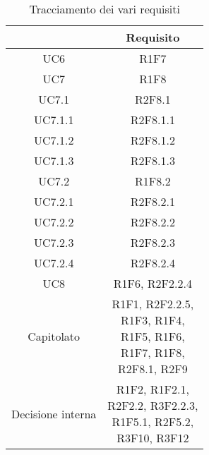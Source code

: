 \begin{table}[H]
	\centering
	\renewcommand{\arraystretch}{1.8}
	\begin{tabular}{c | c}
		\rowcolor[HTML]{125E28}
		\multicolumn{1}{c}{\color[HTML]{FFFFFF} \textbf{Fonte}} &
		\multicolumn{1}{c}{\color[HTML]{FFFFFF} \textbf{Requisito}}                                \\
		\hline
		UC6                                                     & R1F7                             \\ \hline
		UC7                                                     & R1F8                             \\ \hline
		UC7.1                                                   & R2F8.1                           \\ \hline
		UC7.1.1                                                 & R2F8.1.1                         \\ \hline
		UC7.1.2                                                 & R2F8.1.2                         \\ \hline
		UC7.1.3                                                 & R2F8.1.3                         \\ \hline
		UC7.2                                                   & R1F8.2                           \\ \hline
		UC7.2.1                                                 & R2F8.2.1                         \\ \hline
		UC7.2.2                                                 & R2F8.2.2                         \\ \hline
		UC7.2.3                                                 & R2F8.2.3                         \\ \hline
		UC7.2.4                                                 & R2F8.2.4                         \\ \hline
		UC8                                                     & R1F6, R2F2.2.4                   \\ \hline
		Capitolato                                              & \Shortunderstack{R1F1, R2F2.2.5, \\R1F3, R1F4, \\R1F5, R1F6, \\R1F7, R1F8,\\ R2F8.1, R2F9\\}  \\ \hline
		Decisione interna                                       & \Shortunderstack{R1F2,  R1F2.1,  \\R2F2.2, R3F2.2.3,\\ R1F5.1, R2F5.2,\\ R3F10, R3F12\\} \\
	\end{tabular}
	\caption{Tracciamento dei vari requisiti}
\end{table}

